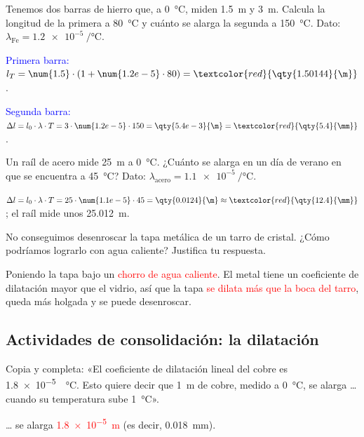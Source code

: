 \begin{exercise}
    Tenemos dos barras de hierro que, a \qty{0}{\degreeCelsius}, miden \qty{1.5}{\m} y \qty{3}{\m}. Calcula la longitud de la primera a \qty{80}{\degreeCelsius} y cuánto se alarga la segunda a \qty{150}{\degreeCelsius}. Dato: \(\lambda_{\text{Fe}} = \qty[per-mode=power]{1.2e-5}{\per\degreeCelsius}\).
    \begin{solu}
        \textcolor{blue}{Primera barra:} \(l_T = \num{1.5} \cdot (1 + \num{1.2e-5} \cdot 80) = \textcolor{red}{\qty{1.50144}{\m}}\).

        \textcolor{blue}{Segunda barra:} \(\Delta l = l_0 \cdot \lambda \cdot T = 3 \cdot \num{1.2e-5} \cdot 150 = \qty{5.4e-3}{\m} = \textcolor{red}{\qty{5.4}{\mm}}\).
    \end{solu}
\end{exercise}

\begin{exercise}
    Un raíl de acero mide \qty{25}{\m} a \qty{0}{\degreeCelsius}. ¿Cuánto se alarga en un día de verano en que se encuentra a \qty{45}{\degreeCelsius}? Dato: \(\lambda_{\text{acero}} = \qty[per-mode=power]{1.1e-5}{\per\degreeCelsius}\).
    \begin{solu}
        \(\Delta l = l_0 \cdot \lambda \cdot T = 25 \cdot \num{1.1e-5} \cdot 45 = \qty{0.0124}{\m} \approx \textcolor{red}{\qty{12.4}{\mm}}\); el raíl mide unos \qty{25.012}{\m}.
    \end{solu}
\end{exercise}

\begin{exercise}
    No conseguimos desenroscar la tapa metálica de un tarro de cristal. ¿Cómo podríamos lograrlo con agua caliente? Justifica tu respuesta.
    \begin{solu}
        Poniendo la tapa bajo un \textcolor{red}{chorro de agua caliente}. El metal tiene un coeficiente de dilatación mayor que el vidrio, así que la tapa \textcolor{red}{se dilata más que la boca del tarro}, queda más holgada y se puede desenroscar.
    \end{solu}
\end{exercise}

\subsection*{Actividades de consolidación: la dilatación}

\begin{exercise}
    Copia y completa: «El coeficiente de dilatación lineal del cobre es \qty[per-mode=power]{1.8e-5}{\per\degreeCelsius}. Esto quiere decir que \qty{1}{\m} de cobre, medido a \qty{0}{\degreeCelsius}, se alarga \ldots{} cuando su temperatura sube \qty{1}{\degreeCelsius}».
    \begin{solu}
        \ldots{} se alarga \textcolor{red}{\qty{1.8e-5}{\m}} (es decir, \qty{0.018}{\mm}).
    \end{solu}
\end{exercise}

